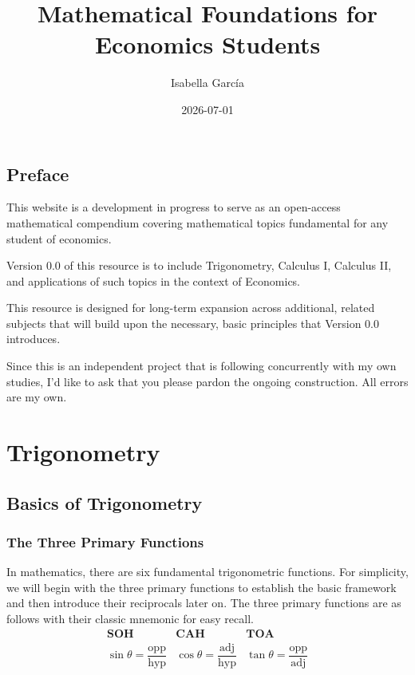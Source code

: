 \documentclass[
  letterpaper,
  DIV=11,
  numbers=noendperiod]{scrreprt}
\title{Mathematical Foundations for Economics Students}
\author{Isabella García}
\date{2026-07-01}
\renewcommand*\contentsname{Table of contents}
\newcommand\contentsname{Table of contents}
\begin{document}
\maketitle

\renewcommand*\contentsname{Table of contents}
{
\setcounter{tocdepth}{2}
\tableofcontents
}


\chapter*{Preface}\label{preface}


This website is a development in progress to serve as an open-access
mathematical compendium covering mathematical topics fundamental for any
student of economics.

Version 0.0 of this resource is to include Trigonometry, Calculus I,
Calculus II, and applications of such topics in the context of
Economics.

This resource is designed for long-term expansion across additional,
related subjects that will build upon the necessary, basic principles
that Version 0.0 introduces.

Since this is an independent project that is following concurrently with
my own studies, I'd like to ask that you please pardon the ongoing
construction. All errors are my own.

\part{Trigonometry}

\chapter{Basics of Trigonometry}\label{basics-of-trigonometry}

\section{The Three Primary Functions}\label{the-three-primary-functions}

In mathematics, there are six fundamental trigonometric functions. For
simplicity, we will begin with the three primary functions to establish
the basic framework and then introduce their reciprocals later on. The
three primary functions are as follows with their classic mnemonic for
easy recall. \[
\begin{array}{ccc}
\textbf{SOH} & \textbf{CAH} & \textbf{TOA} \\[6pt]
\sin\theta = \dfrac{\text{opp}}{\text{hyp}} &
\cos\theta = \dfrac{\text{adj}}{\text{hyp}} &
\tan\theta = \dfrac{\text{opp}}{\text{adj}}
\end{array}
\]
\end{document}
